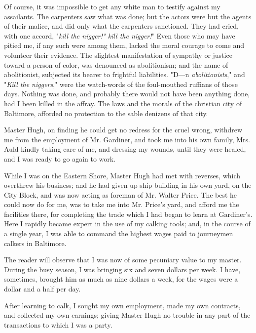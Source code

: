 Of course, it was impossible to get any white man to testify against my
assailants. The carpenters saw what was done; but the actors were but
the agents of their malice, and did only what the carpenters sanctioned.
They had cried, with one accord, "\emph{kill the nigger!" kill the
nigger!}" Even those who may have pitied me, if any such were among
them, lacked the moral courage to come and volunteer their evidence. The
slightest manifestation of sympathy or justice toward a person of color,
was denounced as abolitionism; and the name of abolitionist, subjected
its bearer to frightful liabilities. "D---n \emph{abolitionists}," and
"\emph{Kill the niggers}," were the watch-words of the foul-mouthed
ruffians of those days. Nothing was done, and probably there would not
have been anything done, had I been killed in the affray. The laws and
the morals of the christian city of {}Baltimore, afforded no protection
to the sable denizens of that city.

Master Hugh, on finding he could get no redress for the cruel wrong,
withdrew me from the employment of Mr. Gardiner, and took me into his
own family, Mrs. Auld kindly taking care of me, and dressing my wounds,
until they were healed, and I was ready to go again to work.

While I was on the Eastern Shore, Master Hugh had met with reverses,
which overthrew his business; and he had given up ship building in his
own yard, on the City Block, and was now acting as foreman of Mr. Walter
Price. The best he could now do for me, was to take me into Mr. Price's
yard, and afford me the facilities there, for completing the trade which
I had began to learn at Gardiner's. Here I rapidly became expert in the
use of my calking tools; and, in the course of a single year, I was able
to command the highest wages paid to journeymen calkers in Baltimore.

The reader will observe that I was now of some pecuniary value to my
master. During the busy season, I was bringing six and seven dollars per
week. I have, sometimes, brought him as much as nine dollars a week, for
the wages were a dollar and a half per day.

After learning to calk, I sought my own employment, made my own
contracts, and collected my own earnings; giving Master Hugh no trouble
in any part of the transactions to which I was a party.

